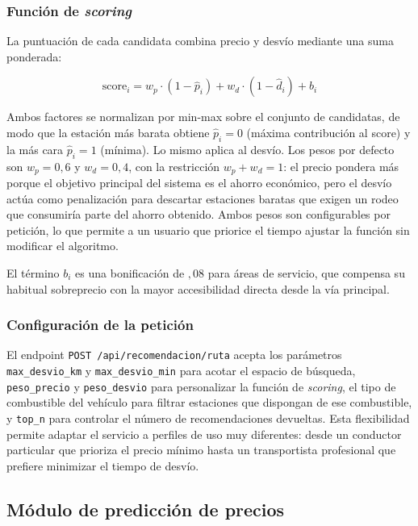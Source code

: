 \subsubsection*{Función de \textit{scoring}}

La puntuación de cada candidata combina precio y desvío mediante una
suma ponderada:

\begin{equation}
  \text{score}_i = w_p \cdot (1 - \hat{p}_i) + w_d \cdot (1 - \hat{d}_i) + b_i
  \label{eq:scoring}
\end{equation}

Ambos factores se normalizan por min-max sobre el conjunto de candidatas,
de modo que la estación más barata obtiene $\hat{p}_i = 0$ (máxima
contribución al score) y la más cara $\hat{p}_i = 1$ (mínima). Lo mismo
aplica al desvío. Los pesos por defecto son $w_p = 0{,}6$ y $w_d = 0{,}4$,
con la restricción $w_p + w_d = 1$: el precio pondera más porque el
objetivo principal del sistema es el ahorro económico, pero el desvío
actúa como penalización para descartar estaciones baratas que exigen un
rodeo que consumiría parte del ahorro obtenido. Ambos pesos son
configurables por petición, lo que permite a un usuario que priorice el
tiempo ajustar la función sin modificar el algoritmo.

El término $b_i$ es una bonificación de ${,}08$ para áreas de servicio,
que compensa su habitual sobreprecio con la mayor accesibilidad directa
desde la vía principal.


\subsubsection*{Configuración de la petición}

El endpoint \texttt{POST~/api/recomendacion/ruta} acepta los parámetros
\texttt{max\_desvio\_km} y \texttt{max\_desvio\_min} para acotar el espacio de búsqueda,
\texttt{peso\_precio} y \texttt{peso\_desvio} para personalizar la función de
\textit{scoring}, el tipo de combustible del vehículo para filtrar estaciones que
dispongan de ese combustible, y \texttt{top\_n} para controlar el número de
recomendaciones devueltas. Esta flexibilidad permite adaptar el servicio a perfiles de
uso muy diferentes: desde un conductor particular que prioriza el precio mínimo hasta un
transportista profesional que prefiere minimizar el tiempo de desvío.

\subsection{Módulo de predicción de precios}
\label{subsec:prediccion_impl}


